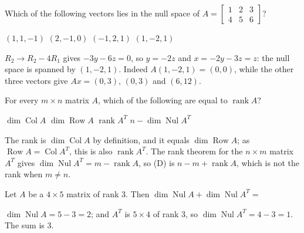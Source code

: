 \begin{question}[id=rank-15]
Which of the following vectors lies in the null space of $A = \begin{bmatrix} 1 & 2 & 3 \\ 4 & 5 & 6 \end{bmatrix}$?
\begin{options}
  \option $(1, 1, -1)$
  \option $(2, -1, 0)$
  \option $(-1, 2, 1)$
  \correct $(1, -2, 1)$
\end{options}
\begin{solution}
$R_2 \to R_2 - 4R_1$ gives $-3y - 6z = 0$, so $y = -2z$ and $x = -2y - 3z = z$: the null space is spanned by $(1, -2, 1)$. Indeed $A(1, -2, 1) = (0, 0)$, while the other three vectors give $Ax = (0, 3)$, $(0, 3)$ and $(6, 12)$.
\end{solution}
\end{question}

\begin{question}[id=rank-16, type=msq, marks=2]
For every $m \times n$ matrix $A$, which of the following are equal to $\operatorname{rank} A$?
\begin{options}
  \correct $\dim \operatorname{Col} A$
  \correct $\dim \operatorname{Row} A$
  \correct $\operatorname{rank} A^T$
  \option $n - \dim \operatorname{Nul} A^T$
\end{options}
\begin{solution}
The rank is $\dim \operatorname{Col} A$ by definition, and it equals $\dim \operatorname{Row} A$; as $\operatorname{Row} A = \operatorname{Col} A^T$, this is also $\operatorname{rank} A^T$. The rank theorem for the $n \times m$ matrix $A^T$ gives $\dim \operatorname{Nul} A^T = m - \operatorname{rank} A$, so (D) is $n - m + \operatorname{rank} A$, which is not the rank when $m \ne n$.
\end{solution}
\end{question}

\begin{question}[id=rank-17, marks=2]
Let $A$ be a $4 \times 5$ matrix of rank 3. Then $\dim \operatorname{Nul} A + \dim \operatorname{Nul} A^T =$
\begin{solution}
$\dim \operatorname{Nul} A = 5 - 3 = 2$; and $A^T$ is $5 \times 4$ of rank 3, so $\dim \operatorname{Nul} A^T = 4 - 3 = 1$. The sum is 3.
\end{solution}
\end{question}

